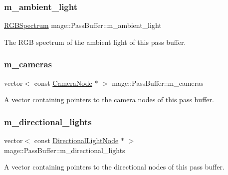 \subsubsection{\texorpdfstring{m\+\_\+ambient\+\_\+light}{m\_ambient\_light}}
{\footnotesize\ttfamily \hyperlink{structmage_1_1_r_g_b_spectrum}{R\+G\+B\+Spectrum} mage\+::\+Pass\+Buffer\+::m\+\_\+ambient\+\_\+light\hspace{0.3cm}{\ttfamily [private]}}

The R\+GB spectrum of the ambient light of this pass buffer. \hypertarget{structmage_1_1_pass_buffer_a4885440342be6a2cd11002781704a63f}{}\label{structmage_1_1_pass_buffer_a4885440342be6a2cd11002781704a63f} 
\subsubsection{\texorpdfstring{m\+\_\+cameras}{m\_cameras}}
{\footnotesize\ttfamily vector$<$ const \hyperlink{classmage_1_1_camera_node}{Camera\+Node} $\ast$ $>$ mage\+::\+Pass\+Buffer\+::m\+\_\+cameras\hspace{0.3cm}{\ttfamily [private]}}

A vector containing pointers to the camera nodes of this pass buffer. \hypertarget{structmage_1_1_pass_buffer_a20f2a4518ea6121e6c9ae0ed9d263435}{}\label{structmage_1_1_pass_buffer_a20f2a4518ea6121e6c9ae0ed9d263435} 
\subsubsection{\texorpdfstring{m\+\_\+directional\+\_\+lights}{m\_directional\_lights}}
{\footnotesize\ttfamily vector$<$ const \hyperlink{namespacemage_a7637b5351fc0f66a10badd80ebb35899}{Directional\+Light\+Node} $\ast$ $>$ mage\+::\+Pass\+Buffer\+::m\+\_\+directional\+\_\+lights\hspace{0.3cm}{\ttfamily [private]}}

A vector containing pointers to the directional nodes of this pass buffer. \hypertarget{structmage_1_1_pass_buffer_a3691cc52fe3bc5f1c86bf0dad36061d8}{}\label{structmage_1_1_pass_buffer_a3691cc52fe3bc5f1c86bf0dad36061d8} 
